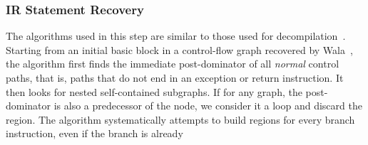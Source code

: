 
\subsubsection{IR Statement Recovery}
%
 The algorithms used in this step are similar to those used for decompilation~\cite{Yakdan15@decompilation}. %
%
Starting from an initial basic block in a control-flow graph recovered by Wala~\cite{Wala}, the algorithm first finds
the immediate post-dominator of all {\em normal} control paths, that is, paths that do not end in an exception or return
instruction.
%
It then looks for nested self-contained subgraphs.
%
If for any graph, the post-dominator is also a predecessor of the node, we consider it a loop and discard the region.
%
The algorithm systematically attempts to build regions for every branch instruction, even if the branch is already
